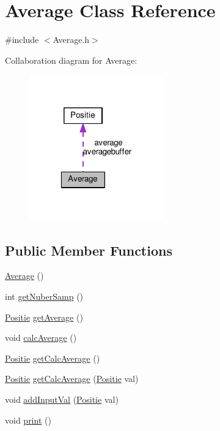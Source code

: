 \hypertarget{classAverage}{\section{Average Class Reference}
\label{classAverage}
}


{\ttfamily \#include $<$Average.\-h$>$}



Collaboration diagram for Average\-:
\nopagebreak
\begin{figure}[H]
\begin{center}
\leavevmode
\includegraphics[width=166pt]{classAverage__coll__graph}
\end{center}
\end{figure}
\subsection*{Public Member Functions}
\begin{DoxyCompactItemize}
\item 
\hyperlink{classAverage_a25a54da41e8cae37098db4060ec5caf9}{Average} ()
\item 
int \hyperlink{classAverage_a0731ceab3cfbc6f88a26edc9319c778f}{get\-Nuber\-Samp} ()
\item 
\hyperlink{classPositie}{Positie} \hyperlink{classAverage_a80546f32249549643af4e09661763ec1}{get\-Average} ()
\item 
void \hyperlink{classAverage_a25f9ec5ac7f9f65e1d5af39b6d9626ec}{calc\-Average} ()
\item 
\hyperlink{classPositie}{Positie} \hyperlink{classAverage_a4e8e7238796949de80376e687f07dece}{get\-Calc\-Average} ()
\item 
\hyperlink{classPositie}{Positie} \hyperlink{classAverage_a607bf7034d4a7c3ef58f27b3cd7af943}{get\-Calc\-Average} (\hyperlink{classPositie}{Positie} val)
\item 
void \hyperlink{classAverage_a53554687cc447765fb0e9a7c3742fe89}{add\-Input\-Val} (\hyperlink{classPositie}{Positie} val)
\item 
void \hyperlink{classAverage_a954341c85ff2adf25f38e1769ec9d5cf}{print} ()
\end{DoxyCompactItemize}
